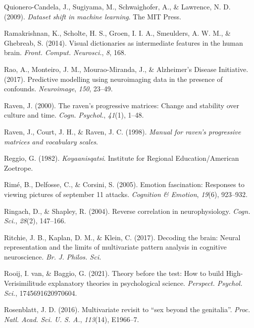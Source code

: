 \documentclass[11pt,american,a4paper,oneside,]{memoir} %
\begin{document}
\leavevmode\hypertarget{ref-Quionero-Candela2009-ge}{}%
Quionero-Candela, J., Sugiyama, M., Schwaighofer, A., \& Lawrence, N. D. (2009). \emph{Dataset shift in machine learning}. The MIT Press.

\leavevmode\hypertarget{ref-Ramakrishnan2014-ki}{}%
Ramakrishnan, K., Scholte, H. S., Groen, I. I. A., Smeulders, A. W. M., \& Ghebreab, S. (2014). Visual dictionaries as intermediate features in the human brain. \emph{Front. Comput. Neurosci.}, \emph{8}, 168.

\leavevmode\hypertarget{ref-Rao2017-bw}{}%
Rao, A., Monteiro, J. M., Mourao-Miranda, J., \& Alzheimer's Disease Initiative. (2017). Predictive modelling using neuroimaging data in the presence of confounds. \emph{Neuroimage}, \emph{150}, 23--49.

\leavevmode\hypertarget{ref-Raven2000-hs}{}%
Raven, J. (2000). The raven's progressive matrices: Change and stability over culture and time. \emph{Cogn. Psychol.}, \emph{41}(1), 1--48.

\leavevmode\hypertarget{ref-Raven1998-om}{}%
Raven, J., Court, J. H., \& Raven, J. C. (1998). \emph{Manual for raven's progressive matrices and vocabulary scales}.

\leavevmode\hypertarget{ref-Reggio1982-ex}{}%
Reggio, G. (1982). \emph{Koyaanisqatsi}. Institute for Regional Education/American Zoetrope.

\leavevmode\hypertarget{ref-rime2005brief}{}%
Rimé, B., Delfosse, C., \& Corsini, S. (2005). Emotion fascination: Responses to viewing pictures of september 11 attacks. \emph{Cognition \& Emotion}, \emph{19}(6), 923--932.

\leavevmode\hypertarget{ref-Ringach2004-nn}{}%
Ringach, D., \& Shapley, R. (2004). Reverse correlation in neurophysiology. \emph{Cogn. Sci.}, \emph{28}(2), 147--166.

\leavevmode\hypertarget{ref-Ritchie2017-gl}{}%
Ritchie, J. B., Kaplan, D. M., \& Klein, C. (2017). Decoding the brain: Neural representation and the limits of multivariate pattern analysis in cognitive neuroscience. \emph{Br. J. Philos. Sci.}

\leavevmode\hypertarget{ref-Van_Rooij2021-bk}{}%
Rooij, I. van, \& Baggio, G. (2021). Theory before the test: How to build High-Verisimilitude explanatory theories in psychological science. \emph{Perspect. Psychol. Sci.}, 1745691620970604.

\leavevmode\hypertarget{ref-Rosenblatt2016-oy}{}%
Rosenblatt, J. D. (2016). Multivariate revisit to ``sex beyond the genitalia''. \emph{Proc. Natl. Acad. Sci. U. S. A.}, \emph{113}(14), E1966--7.
\end{document}
